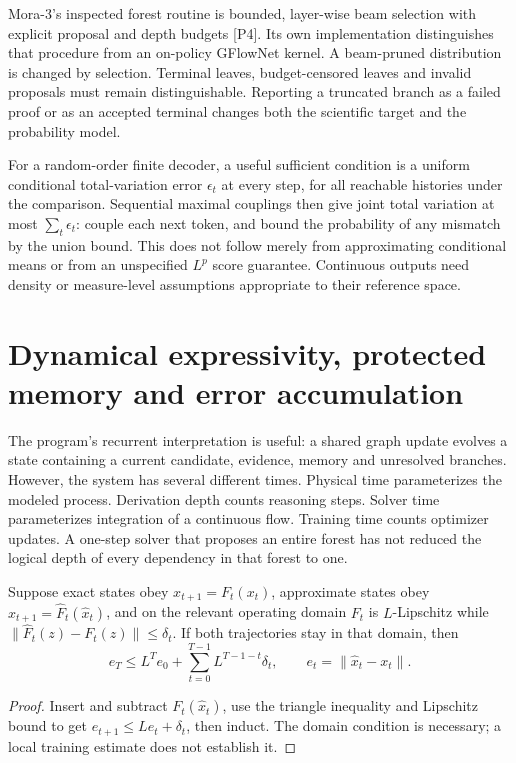 Mora-3's inspected forest routine is bounded, layer-wise beam selection with explicit proposal and depth budgets [P4]. Its own implementation distinguishes that procedure from an on-policy GFlowNet kernel. A beam-pruned distribution is changed by selection. Terminal leaves, budget-censored leaves and invalid proposals must remain distinguishable. Reporting a truncated branch as a failed proof or as an accepted terminal changes both the scientific target and the probability model.

For a random-order finite decoder, a useful sufficient condition is a uniform conditional total-variation error $\epsilon_t$ at every step, for all reachable histories under the comparison. Sequential maximal couplings then give joint total variation at most $\sum_t\epsilon_t$: couple each next token, and bound the probability of any mismatch by the union bound. This does not follow merely from approximating conditional means or from an unspecified $L^p$ score guarantee. Continuous outputs need density or measure-level assumptions appropriate to their reference space.

\section{Dynamical expressivity, protected memory and error accumulation}
\label{sec:wb-language-dynamics}

The program's recurrent interpretation is useful: a shared graph update evolves a state containing a current candidate, evidence, memory and unresolved branches. However, the system has several different times. Physical time parameterizes the modeled process. Derivation depth counts reasoning steps. Solver time parameterizes integration of a continuous flow. Training time counts optimizer updates. A one-step solver that proposes an entire forest has not reduced the logical depth of every dependency in that forest to one.

\begin{proposition}
Suppose exact states obey $x_{t+1}=F_t(x_t)$, approximate states obey $\hat x_{t+1}=\hat F_t(\hat x_t)$, and on the relevant operating domain $F_t$ is $L$-Lipschitz while $\|\hat F_t(z)-F_t(z)\|\le\delta_t$. If both trajectories stay in that domain, then
\[
 e_T\le L^T e_0+\sum_{t=0}^{T-1}L^{T-1-t}\delta_t,
 \qquad e_t=\|\hat x_t-x_t\|.
\]
\end{proposition}
\begin{proof}
Insert and subtract $F_t(\hat x_t)$, use the triangle inequality and Lipschitz bound to get $e_{t+1}\le Le_t+\delta_t$, then induct. The domain condition is necessary; a local training estimate does not establish it.
\end{proof}

